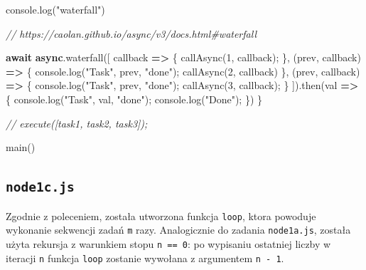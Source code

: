 \documentclass[11pt]{article}
\newenvironment{Shaded}{}{}
\newcommand{\KeywordTok}[1]{\textcolor[rgb]{0.00,0.44,0.13}{\textbf{{#1}}}}
\newcommand{\DecValTok}[1]{\textcolor[rgb]{0.25,0.63,0.44}{{#1}}}
\newcommand{\StringTok}[1]{\textcolor[rgb]{0.25,0.44,0.63}{{#1}}}
\newcommand{\CommentTok}[1]{\textcolor[rgb]{0.38,0.63,0.69}{\textit{{#1}}}}
\newcommand{\FunctionTok}[1]{\textcolor[rgb]{0.02,0.16,0.49}{{#1}}}
\newcommand{\NormalTok}[1]{{#1}}
\newcommand{\ControlFlowTok}[1]{\textcolor[rgb]{0.00,0.44,0.13}{\textbf{{#1}}}}
\newcommand{\OperatorTok}[1]{\textcolor[rgb]{0.40,0.40,0.40}{{#1}}}
\newcommand{\BuiltInTok}[1]{{#1}}
\begin{document}
\begin{Shaded}
\begin{Highlighting}[]
    \BuiltInTok{console}\OperatorTok{.}\FunctionTok{log}\NormalTok{(}\StringTok{"waterfall"}\NormalTok{)}

    \CommentTok{// https://caolan.github.io/async/v3/docs.html\#waterfall}

    \ControlFlowTok{await} \KeywordTok{async}\OperatorTok{.}\FunctionTok{waterfall}\NormalTok{([}
\NormalTok{        callback }\KeywordTok{=\textgreater{}}\NormalTok{ \{}
            \FunctionTok{callAsync}\NormalTok{(}\DecValTok{1}\OperatorTok{,}\NormalTok{ callback)}\OperatorTok{;}
\NormalTok{        \}}\OperatorTok{,}
\NormalTok{        (prev}\OperatorTok{,}\NormalTok{ callback) }\KeywordTok{=\textgreater{}}\NormalTok{ \{}
            \BuiltInTok{console}\OperatorTok{.}\FunctionTok{log}\NormalTok{(}\StringTok{"Task"}\OperatorTok{,}\NormalTok{ prev}\OperatorTok{,} \StringTok{"done"}\NormalTok{)}\OperatorTok{;}
            \FunctionTok{callAsync}\NormalTok{(}\DecValTok{2}\OperatorTok{,}\NormalTok{ callback)}
\NormalTok{        \}}\OperatorTok{,}
\NormalTok{        (prev}\OperatorTok{,}\NormalTok{ callback) }\KeywordTok{=\textgreater{}}\NormalTok{ \{}
            \BuiltInTok{console}\OperatorTok{.}\FunctionTok{log}\NormalTok{(}\StringTok{"Task"}\OperatorTok{,}\NormalTok{ prev}\OperatorTok{,} \StringTok{"done"}\NormalTok{)}\OperatorTok{;}
            \FunctionTok{callAsync}\NormalTok{(}\DecValTok{3}\OperatorTok{,}\NormalTok{ callback)}\OperatorTok{;}
\NormalTok{        \}}
\NormalTok{    ])}\OperatorTok{.}\FunctionTok{then}\NormalTok{(val }\KeywordTok{=\textgreater{}}\NormalTok{ \{}
        \BuiltInTok{console}\OperatorTok{.}\FunctionTok{log}\NormalTok{(}\StringTok{"Task"}\OperatorTok{,}\NormalTok{ val}\OperatorTok{,} \StringTok{"done"}\NormalTok{)}\OperatorTok{;}
        \BuiltInTok{console}\OperatorTok{.}\FunctionTok{log}\NormalTok{(}\StringTok{"Done"}\NormalTok{)}\OperatorTok{;}
\NormalTok{    \})}
\NormalTok{\}}

\CommentTok{// execute([task1, task2, task3]);}

\FunctionTok{main}\NormalTok{()}
\end{Highlighting}
\end{Shaded}

    \hypertarget{node1c.js}{%
\subsection{\texorpdfstring{\texttt{node1c.js}}{node1c.js}}\label{node1c.js}}

Zgodnie z poleceniem, została utworzona funkcja \texttt{loop}, ktora
powoduje wykonanie sekwencji zadań \texttt{m} razy. Analogicznie do
zadania \texttt{node1a.js}, została użyta rekursja z warunkiem stopu
\texttt{n\ ==\ 0}: po wypisaniu ostatniej liczby w iteracji \texttt{n}
funkcja \texttt{loop} zostanie wywołana z argumentem \texttt{n\ -\ 1}.
\end{document}

